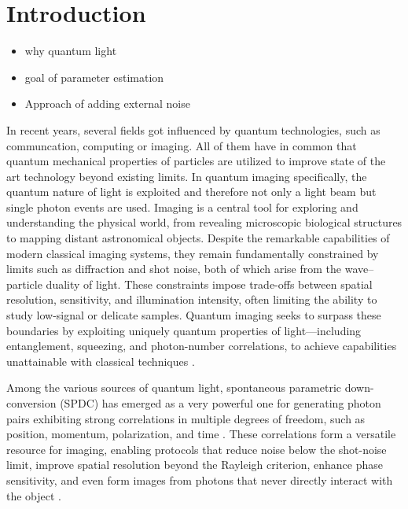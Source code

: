 \section{Introduction}

\begin{itemize}
    \item why quantum light
    \item goal of parameter estimation
    \item Approach of adding external noise
\end{itemize}
In recent years, several fields got influenced by quantum technologies, such as communcation, computing or imaging. All of them have in common that quantum mechanical properties of particles are utilized to improve state of the art technology beyond existing limits. \newline
In quantum imaging specifically, the quantum nature of light is exploited and therefore not only a light beam but single photon events are used. 
\newline
Imaging is a central tool for exploring and understanding the physical world, from revealing microscopic biological structures to mapping distant astronomical objects. Despite the remarkable capabilities of modern classical imaging systems, they remain fundamentally constrained by limits such as diffraction and shot noise, both of which arise from the wave--particle duality of light. These constraints impose trade-offs between spatial resolution, sensitivity, and illumination intensity, often limiting the ability to study low-signal or delicate samples. Quantum imaging seeks to surpass these boundaries by exploiting uniquely quantum properties of light---including entanglement, squeezing, and photon-number correlations, to achieve capabilities unattainable with classical techniques \cite{defienneAdvancesQuantumImaging2024,moreauImagingQuantumStates2019}.

Among the various sources of quantum light, spontaneous parametric down-conversion (SPDC) has emerged as a very powerful one for generating photon pairs exhibiting strong correlations in multiple degrees of freedom, such as position, momentum, polarization, and time \cite{moreauImagingQuantumStates2019}. These correlations form a versatile resource for imaging, enabling protocols that reduce noise below the shot-noise limit, improve spatial resolution beyond the Rayleigh criterion, enhance phase sensitivity, and even form images from photons that never directly interact with the object \cite{defienneAdvancesQuantumImaging2024,moreauImagingQuantumStates2019}. 


